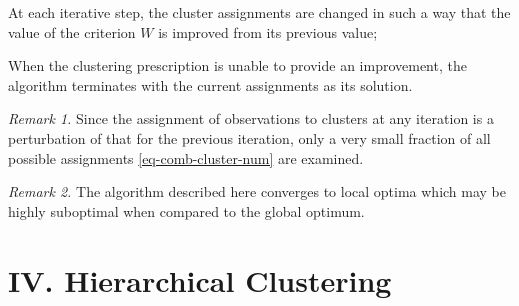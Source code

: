 \documentclass[12pt]{article}
\begin{document}
\begin{enumerate}[label=\textbf{\arabic*.}]
\begin{minipage}{\linewidth}
\begin{algorithm}[H]
\begin{algorithmic}[1]
			\STATE At each iterative step, the cluster assignments are changed in such a way that the value of the criterion $W$ is improved from its previous value; 
			
			\STATE When the clustering prescription is unable to provide an improvement, the algorithm terminates with the current assignments as its solution. 
			
		\end{algorithmic} 
	\end{algorithm}
	\end{minipage}
	\vspace{10pt}
		
	\textit{Remark 1.} Since the assignment of observations to clusters at any iteration is a perturbation of that for the previous iteration, only a very small fraction of all possible assignments \eqref{eq-comb-cluster-num} are examined. 
	
	\textit{Remark 2.} The algorithm described here converges to local optima which may be highly suboptimal when compared to the global optimum. 
	
\end{enumerate}


\section*{IV. Hierarchical Clustering}
\end{document}
